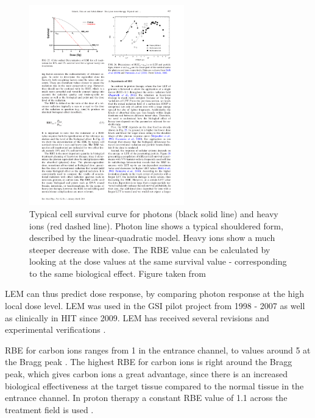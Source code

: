 \newpage

\begin{figure}[H]
\begin{center}
\includegraphics[width=0.6\textwidth]{./Fundamentals/Images/dose_dependence.pdf}
\caption{Typical cell survival curve for photons (black solid line) and heavy ions (red dashed line). Photon line shows a typical shouldered form, described by the linear-quadratic model.
Heavy ions show a much steeper decrease with dose. The RBE value can be calculated by looking at the dose values at the same survival value - corresponding to the same biological effect. Figure taken from \cite{Schardt2010}}
\label{dosedep}
\end{center}
\end{figure}

 
LEM can thus predict dose response, by comparing
photon response at the high local dose level. LEM was used in the GSI pilot project from 1998 - 2007 \cite{Kraemer2000, Kraemer2000a} as well as clinically in HIT since 2009. LEM has received several revisions \cite{Elsaesser2006, Elsaesser2007, Elsaesser2009} and experimental verifications
\cite{Mitaroff1998, Kraemer2000a, Kraemer2003}. 

RBE for carbon ions ranges from 1 in the entrance channel, to values around 5 at 
the Bragg peak \cite{Kraft2000}. The highest RBE for carbon ions is right around the Bragg peak, which gives carbon ions a great advantage, since there is an increased 
biological effectiveness at the target tissue compared to the normal tissue in the entrance channel. In proton therapy a constant RBE value of 1.1 across the treatment field
is used \cite{Paganetti2002}.

